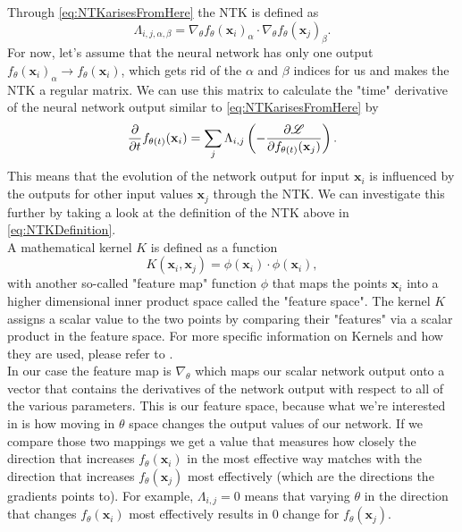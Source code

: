 Through \cref{eq:NTKarisesFromHere} the NTK is defined as 
\begin{equation}\label{eq:NTKDefinition}
	\Lambda_{i,j,\alpha,\beta} = \nabla_\theta f_\theta(\mathbf{x}_i)_\alpha \cdot \nabla_\theta f_\theta(\mathbf{x}_j)_\beta.
\end{equation}
For now, let's assume that the neural network has only one output $f_\theta(\mathbf{x}_i)_\alpha \rightarrow f_\theta(\mathbf{x}_i)$, which gets rid of the $\alpha$ and $\beta$ indices for us and makes the NTK a regular matrix. We can use this matrix to calculate the "time" derivative of the neural network output similar to \cref{eq:NTKarisesFromHere} by 
\begin{equation}\label{eq:NTKExplanation}
	\frac{\partial}{\partial t}f_{\theta(t)}(\mathbf{x}_i) = \sum_j \Lambda_{i,j} \left(- \frac{\partial\mathscr{L}}{\partial f_{\theta(t)}(\mathbf{x}_j)}\right).
\end{equation}
This means that the evolution of the network output for input $\mathbf{x}_i$ is influenced by the outputs for other input values $\mathbf{x}_j$ through the NTK. We can investigate this further by taking a look at the definition of the NTK above in \cref{eq:NTKDefinition}. \\
A mathematical kernel $K$ is defined as a function
\begin{equation}
	K(\mathbf{x}_i, \mathbf{x}_j) = \phi(\mathbf{x}_i)\cdot\phi(\mathbf{x}_i),
\end{equation}
with another so-called "feature map" function $\phi$ that maps the points $\mathbf{x}_i$ into a higher dimensional inner product space called the "feature space". The kernel $K$ assigns a scalar value to the two points by comparing their "features" via a scalar product in the feature space. For more specific information on Kernels and how they are used, please refer to \cite{KernelMethod}.\\
In our case the feature map is $\nabla_\theta$ which maps our scalar network output onto a vector that contains the derivatives of the network output with respect to all of the various parameters. This is our feature space, because what we're interested in is how moving in $\theta$ space changes the output values of our network. If we compare those two mappings we get a value that measures how closely the direction that increases $f_\theta(\mathbf{x}_i)$ in the most effective way matches with the direction that increases $f_\theta(\mathbf{x}_j)$ most effectively  (which are the directions the gradients points to). For example, $\Lambda_{i,j}=0$ means that varying $\theta$ in the direction that changes $f_\theta(\mathbf{x}_i)$ most effectively results in 0 change for $f_\theta(\mathbf{x}_j)$.\\

